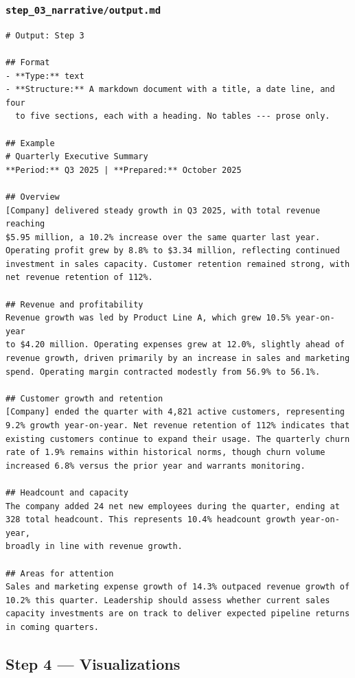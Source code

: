 \documentclass[12pt, a4paper]{article}
\begin{document}
\subsubsection{\texttt{step\_03\_narrative/output.md}}

\begin{lstlisting}[language={}]
# Output: Step 3

## Format
- **Type:** text
- **Structure:** A markdown document with a title, a date line, and four
  to five sections, each with a heading. No tables --- prose only.

## Example
# Quarterly Executive Summary
**Period:** Q3 2025 | **Prepared:** October 2025

## Overview
[Company] delivered steady growth in Q3 2025, with total revenue reaching
$5.95 million, a 10.2% increase over the same quarter last year.
Operating profit grew by 8.8% to $3.34 million, reflecting continued
investment in sales capacity. Customer retention remained strong, with
net revenue retention of 112%.

## Revenue and profitability
Revenue growth was led by Product Line A, which grew 10.5% year-on-year
to $4.20 million. Operating expenses grew at 12.0%, slightly ahead of
revenue growth, driven primarily by an increase in sales and marketing
spend. Operating margin contracted modestly from 56.9% to 56.1%.

## Customer growth and retention
[Company] ended the quarter with 4,821 active customers, representing
9.2% growth year-on-year. Net revenue retention of 112% indicates that
existing customers continue to expand their usage. The quarterly churn
rate of 1.9% remains within historical norms, though churn volume
increased 6.8% versus the prior year and warrants monitoring.

## Headcount and capacity
The company added 24 net new employees during the quarter, ending at
328 total headcount. This represents 10.4% headcount growth year-on-year,
broadly in line with revenue growth.

## Areas for attention
Sales and marketing expense growth of 14.3% outpaced revenue growth of
10.2% this quarter. Leadership should assess whether current sales
capacity investments are on track to deliver expected pipeline returns
in coming quarters.
\end{lstlisting}

\subsection{Step 4 --- Visualizations}
\end{document}
